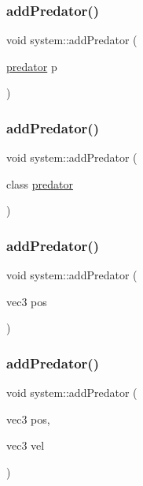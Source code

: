 \subsubsection{\texorpdfstring{add\+Predator()}{addPredator()}\hspace{0.1cm}{\footnotesize\ttfamily [1/4]}}
{\footnotesize\ttfamily void system\+::add\+Predator (\begin{DoxyParamCaption}\item[{\mbox{\hyperlink{classpredator}{predator}}}]{p }\end{DoxyParamCaption})}

\mbox{\label{classsystem_abb9eebd8bd6056a1dd2870314910ee7b}} 
\subsubsection{\texorpdfstring{add\+Predator()}{addPredator()}\hspace{0.1cm}{\footnotesize\ttfamily [2/4]}}
{\footnotesize\ttfamily void system\+::add\+Predator (\begin{DoxyParamCaption}\item[{class \mbox{\hyperlink{classpredator}{predator}}}]{ }\end{DoxyParamCaption})}

\mbox{\label{classsystem_a67e7e860c9d735a214ad1fe849453beb}} 
\subsubsection{\texorpdfstring{add\+Predator()}{addPredator()}\hspace{0.1cm}{\footnotesize\ttfamily [3/4]}}
{\footnotesize\ttfamily void system\+::add\+Predator (\begin{DoxyParamCaption}\item[{vec3}]{pos }\end{DoxyParamCaption})}

\mbox{\label{classsystem_a5392d2e5ff4b8ea1f34da8576a726ff8}} 
\subsubsection{\texorpdfstring{add\+Predator()}{addPredator()}\hspace{0.1cm}{\footnotesize\ttfamily [4/4]}}
{\footnotesize\ttfamily void system\+::add\+Predator (\begin{DoxyParamCaption}\item[{vec3}]{pos,  }\item[{vec3}]{vel }\end{DoxyParamCaption})}


